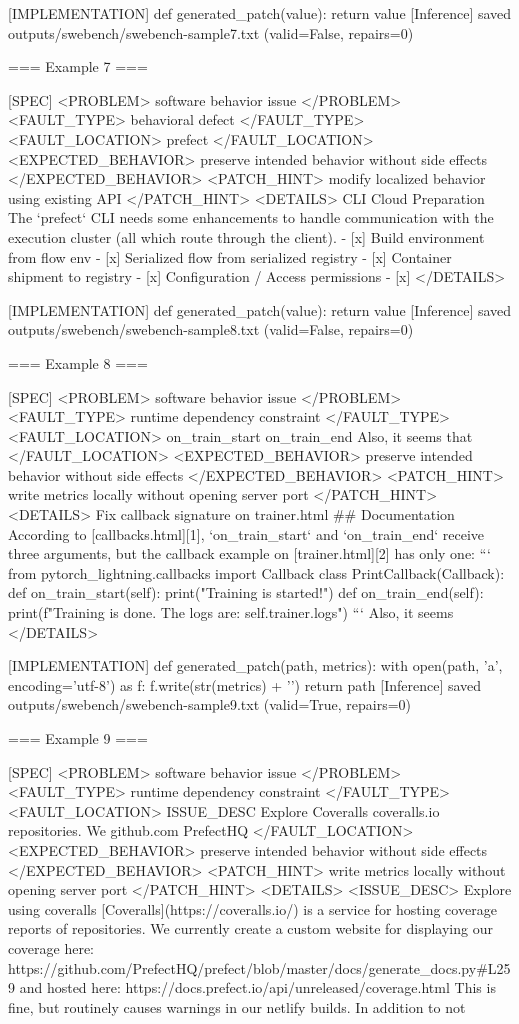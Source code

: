 [IMPLEMENTATION]
def generated_patch(value):
return value
[Inference] saved outputs/swebench/swebench-sample7.txt (valid=False, repairs=0)

=== Example 7 ===

[SPEC]
<PROBLEM> software behavior issue </PROBLEM> <FAULT_TYPE> behavioral defect </FAULT_TYPE> <FAULT_LOCATION> prefect </FAULT_LOCATION> <EXPECTED_BEHAVIOR> preserve intended behavior without side effects </EXPECTED_BEHAVIOR> <PATCH_HINT> modify localized behavior using existing API </PATCH_HINT> <DETAILS> CLI Cloud Preparation The `prefect` CLI needs some enhancements to handle communication with the execution cluster (all which route through the client). - [x] Build environment from flow env - [x] Serialized flow from serialized registry - [x] Container shipment to registry - [x] Configuration / Access permissions - [x] </DETAILS>

[IMPLEMENTATION]
def generated_patch(value):
return value
[Inference] saved outputs/swebench/swebench-sample8.txt (valid=False, repairs=0)

=== Example 8 ===

[SPEC]
<PROBLEM> software behavior issue </PROBLEM> <FAULT_TYPE> runtime dependency constraint </FAULT_TYPE> <FAULT_LOCATION> on_train_start on_train_end Also, it seems that </FAULT_LOCATION> <EXPECTED_BEHAVIOR> preserve intended behavior without side effects </EXPECTED_BEHAVIOR> <PATCH_HINT> write metrics locally without opening server port </PATCH_HINT> <DETAILS> Fix callback signature on trainer.html ## Documentation According to [callbacks.html][1], `on_train_start` and `on_train_end` receive three arguments, but the callback example on [trainer.html][2] has only one: ``` from pytorch_lightning.callbacks import Callback class PrintCallback(Callback): def on_train_start(self): print("Training is started!") def on_train_end(self): print(f"Training is done. The logs are: {self.trainer.logs}") ``` Also, it seems </DETAILS>

[IMPLEMENTATION]
def generated_patch(path, metrics):
with open(path, 'a', encoding='utf-8') as f:
f.write(str(metrics) + '\n')
return path
[Inference] saved outputs/swebench/swebench-sample9.txt (valid=True, repairs=0)

=== Example 9 ===

[SPEC]
<PROBLEM> software behavior issue </PROBLEM> <FAULT_TYPE> runtime dependency constraint </FAULT_TYPE> <FAULT_LOCATION> ISSUE_DESC Explore Coveralls coveralls.io repositories. We github.com PrefectHQ </FAULT_LOCATION> <EXPECTED_BEHAVIOR> preserve intended behavior without side effects </EXPECTED_BEHAVIOR> <PATCH_HINT> write metrics locally without opening server port </PATCH_HINT> <DETAILS> <ISSUE_DESC> Explore using coveralls [Coveralls](https://coveralls.io/) is a service for hosting coverage reports of repositories. We currently create a custom website for displaying our coverage here: https://github.com/PrefectHQ/prefect/blob/master/docs/generate_docs.py#L259 and hosted here: https://docs.prefect.io/api/unreleased/coverage.html This is fine, but routinely causes warnings in our netlify builds. In addition to not

